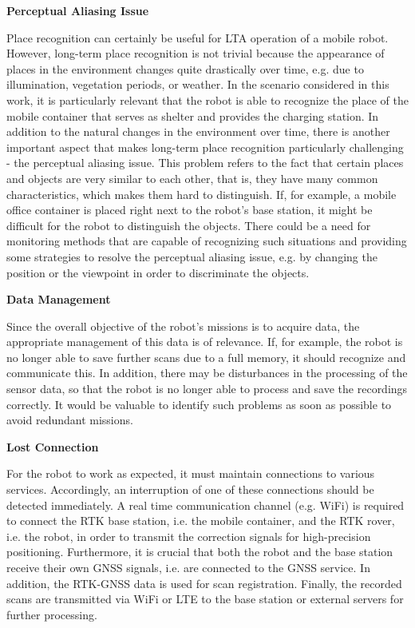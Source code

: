 \documentclass[english, master, utf8]{base/thesis_KBS}
\begin{document}
\noindent
\textbf{Perceptual Aliasing Issue}\newline

\noindent
Place recognition can certainly be useful for LTA operation of a mobile robot. However, long-term place recognition is not trivial because 
the appearance of places in the environment changes quite drastically over time, e.g. due to illumination, vegetation periods, or weather. \cite{Han:2018}
In the scenario considered in this work, it is particularly relevant that the robot is able to recognize the place of the mobile container
that serves as shelter and provides the charging station. In addition to the natural changes in the environment over time, there is another important aspect
that makes long-term place recognition particularly challenging - the perceptual aliasing issue. This problem refers to the fact that certain places and objects are very 
similar to each other, that is, they have many common characteristics, which makes them hard to distinguish. \cite{Han:2018}
If, for example, a mobile office container is placed right next to the robot's base station, it might be difficult for the robot to distinguish the objects.
There could be a need for monitoring methods that are capable of recognizing such situations and providing some strategies to resolve the perceptual aliasing issue,
e.g. by changing the position or the viewpoint in order to discriminate the objects.\newline

\noindent
\textbf{Data Management}\newline

\noindent
Since the overall objective of the robot's missions is to acquire data, the appropriate management of this data is of relevance.
If, for example, the robot is no longer able to save further scans due to a full memory, it should recognize and communicate this.
In addition, there may be disturbances in the processing of the sensor data, so that the robot is no longer able to process and save the recordings correctly.
It would be valuable to identify such problems as soon as possible to avoid redundant missions.\newline

\noindent
\textbf{Lost Connection}\newline

\noindent
For the robot to work as expected, it must maintain connections to various services. Accordingly, an interruption of one of these connections should be detected immediately.
A real time communication channel (e.g. WiFi) is required to connect the RTK base station, i.e. the mobile container, and the RTK rover, i.e. the robot, in order to
transmit the correction signals for high-precision positioning. Furthermore, it is crucial that both the robot and the base station receive their own GNSS signals,
i.e. are connected to the GNSS service. In addition, the RTK-GNSS data is used for scan registration. Finally, the recorded scans are transmitted via WiFi or LTE 
to the base station or external servers for further processing.\newline
\end{document}
